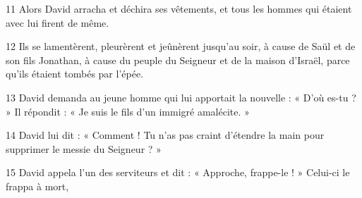 
11 Alors David arracha et déchira ses vêtements, et tous les hommes qui étaient avec lui firent de même. 

12 Ils se lamentèrent, pleurèrent et jeûnèrent jusqu’au soir, à cause de Saül et de son fils Jonathan, à cause du peuple du Seigneur et de la maison d’Israël, parce qu’ils étaient tombés par l’épée.

13 David demanda au jeune homme qui lui apportait la nouvelle : « D’où es-tu ? » Il répondit : « Je suis le fils d’un immigré amalécite. »

14 David lui dit : « Comment ! Tu n’as pas craint d’étendre la main pour supprimer le messie du Seigneur ? »

15 David appela l’un des serviteurs et dit : « Approche, frappe-le ! » Celui-ci le frappa à mort,